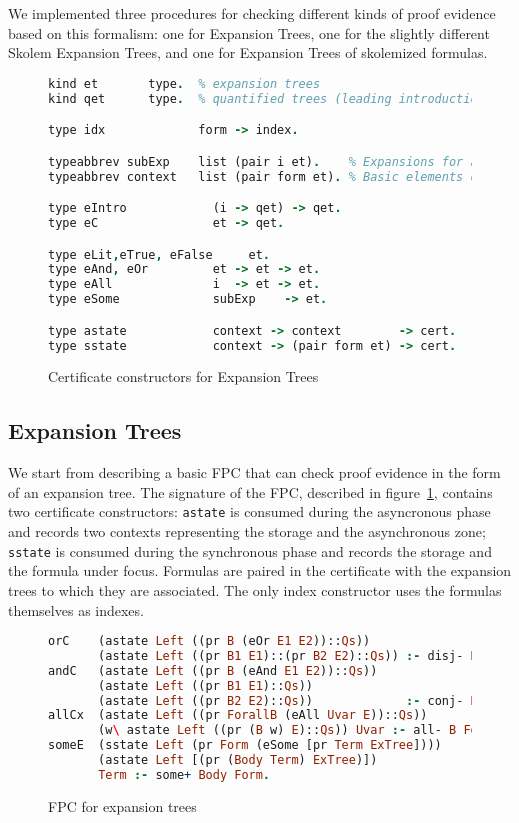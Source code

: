 \documentclass[a4paper,USenglish]{lipics-v2018}
\begin{document}
{We implemented three procedures for checking different kinds of proof
evidence based on this formalism: one for Expansion Trees, one for the
slightly different Skolem Expansion Trees, and one for Expansion Trees
of skolemized formulas.

\begin{figure}
  \begin{lstlisting}[language=prolog]
kind et       type.  % expansion trees
kind qet      type.  % quantified trees (leading introduction of select vars)

type idx             form -> index.

typeabbrev subExp    list (pair i et).    % Expansions for a node
typeabbrev context   list (pair form et). % Basic elements of contexts

type eIntro            (i -> qet) -> qet.
type eC                et -> qet.

type eLit,eTrue, eFalse     et.
type eAnd, eOr         et -> et -> et.
type eAll              i  -> et -> et.
type eSome             subExp    -> et.

type astate            context -> context        -> cert.
type sstate            context -> (pair form et) -> cert.
  \end{lstlisting}
  \caption{Certificate constructors for Expansion Trees}
  \label{fig:exp-cert}
\end{figure}

\subsection{Expansion Trees}

We start from describing a basic FPC that can check proof evidence in
the form of an expansion tree.
%
The signature of the FPC, described in figure~\ref{fig:exp-cert},
contains two certificate constructors: \texttt{astate} is consumed
during the asyncronous phase and records two contexts representing the
storage and the asynchronous zone; \texttt{sstate} is consumed during
the synchronous phase and records the storage and the formula under
focus.
%
Formulas are paired in the certificate with the expansion trees to
which they are associated. The only index constructor uses the
formulas themselves as indexes.

\begin{figure}
\begin{lstlisting}[language=prolog]
orC    (astate Left ((pr B (eOr E1 E2))::Qs))
       (astate Left ((pr B1 E1)::(pr B2 E2)::Qs)) :- disj- B1 B2 B.
andC   (astate Left ((pr B (eAnd E1 E2))::Qs))
       (astate Left ((pr B1 E1)::Qs))
       (astate Left ((pr B2 E2)::Qs))             :- conj- B1 B2 B.
allCx  (astate Left ((pr ForallB (eAll Uvar E))::Qs))
       (w\ astate Left ((pr (B w) E)::Qs)) Uvar :- all- B ForallB.
someE  (sstate Left (pr Form (eSome [pr Term ExTree])))
       (astate Left [(pr (Body Term) ExTree)])
       Term :- some+ Body Form.
\end{lstlisting}
  \caption{FPC for expansion trees}
\label{fig:exp-fpc}
\end{figure}

}
\end{document}
